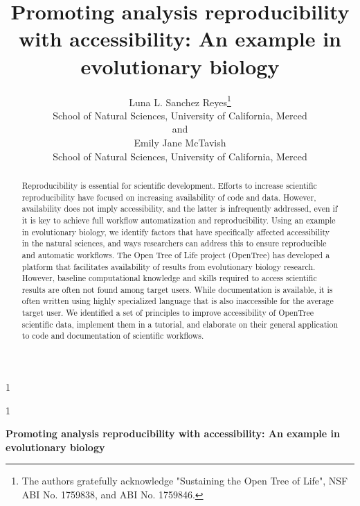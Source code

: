 \documentclass[12pt]{article}
\newcommand{\blind}{1}
\begin{document}
%

\def\spacingset#1{\renewcommand{\baselinestretch}%
{#1}\small\normalsize} \spacingset{1}



\blind
{
  \title{\bf Promoting analysis reproducibility with accessibility: An example in evolutionary biology}
  \author{Luna L. Sanchez Reyes\thanks{
    The authors gratefully acknowledge "Sustaining the Open Tree of Life", NSF ABI No. 1759838, and ABI No. 1759846.}\hspace{.2cm}\\
    School of Natural Sciences, University of California, Merced\\
    and \\
    Emily Jane McTavish \\
    School of Natural Sciences, University of California, Merced}
  \maketitle
} \fi

\blind
{
  \bigskip
  \bigskip
  \bigskip
  \begin{center}
    {\LARGE\bf Promoting analysis reproducibility with accessibility: An example in evolutionary biology}
\end{center}
  \medskip
} \fi

\bigskip
\begin{abstract}
Reproducibility is essential for scientific development. Efforts
to increase scientific reproducibility have focused on increasing availability
of code and data. However, availability does not imply accessibility, and the latter
is infrequently addressed, even if it is key to achieve full workflow automatization
and reproducibility. Using an example in evolutionary biology, we identify factors
that have specifically affected accessibility in
the natural sciences, and ways researchers can address this to ensure reproducible
and automatic workflows.
The Open Tree of Life project (OpenTree) has developed a platform that facilitates
availability of results from evolutionary biology research. However, baseline
computational knowledge and skills required to
access scientific results are often not found among target users. While documentation
is available, it is often written using highly specialized language that is also
 inaccessible for the average target user.
We identified a set of principles to improve accessibility of OpenTree scientific data,
implement them in a tutorial, and elaborate on their general application to code and
documentation of scientific workflows.



\end{abstract}
\end{document}

